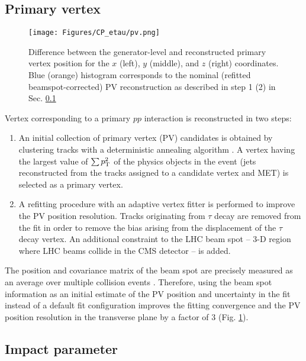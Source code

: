 \subsection{Primary vertex}\label{sec:pv}

\begin{figure}[t!]
    \centering
    \texttt{[image: Figures/CP\_etau/pv.png]}
    \caption{Difference between the generator-level and reconstructed primary vertex position for the $x$ (left), $y$ (middle), and $z$ (right) coordinates. Blue (orange) histogram corresponds to the nominal (refitted beamspot-corrected) PV reconstruction as described in step 1 (2) in Sec. \ref{sec:pv}}
    \label{fig:pv}
\end{figure}
 Vertex corresponding to a primary $pp$ interaction is reconstructed in two steps:
\begin{enumerate}
    \item An initial collection of primary vertex (PV) candidates is obtained by clustering tracks with a deterministic annealing algorithm \cite{726788}. A vertex having the largest value of $\sum p_{\text{T}}^2$ of the physics objects in the event (jets reconstructed from the tracks assigned to a candidate vertex and MET) is selected as a primary vertex.
    \item A refitting procedure with an adaptive vertex fitter \cite{Fruhwirth:2007hz} is performed to improve the PV position resolution. Tracks originating from $\tau$ decay are removed from the fit in order to remove  the bias arising from the displacement of the $\tau$ decay vertex. An additional constraint to the LHC beam spot -- 3-D region where LHC beams collide in the CMS detector -- is added.
\end{enumerate}

The position and covariance matrix of the beam spot are precisely measured as an average over multiple collision events \cite{CMS:2014pgm}. Therefore, using the beam spot information as an initial estimate of the PV position and uncertainty in the fit instead of a default fit configuration improves the fitting convergence and the PV position resolution in the transverse plane by a factor of 3 (Fig. \ref{fig:pv}). 

\subsection{Impact parameter}\label{sec:ip}

